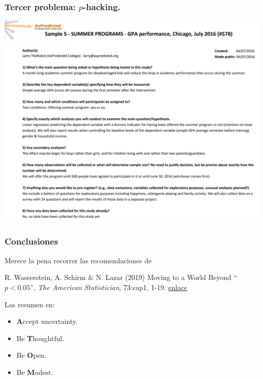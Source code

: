 \documentclass[9pt]{beamer}
\begin{document}
\begin{frame}
  \frametitle{Tercer problema: $p$-hacking.}
    \hspace*{-0.5cm}\includegraphics[height=0.9\textheight]{images/aspredicted_sample}
\end{frame}

\begin{frame}
  \frametitle{Conclusiones}
  Merece la pena recorrer las recomendaciones de
  
  \begin{block}{}
  R. Wasserstein, A. Schirm \& N. Lazar (2019)
  Moving to a World Beyond ``$p < 0.05$'', \textit{The American
    Statistician}, 73:sup1,
  1-19. \href{https://doi.org/10.1080/00031305.2019.1583913}{enlace}
    
\end{block}
Las resumen en:\medskip
\begin{center}
\end{center}

\begin{block}{}
  \begin{itemize}
  \item \textbf{\Huge A}ccept uncertainty.
  \item Be \textbf{\Huge T}houghtful.
   \item Be \textbf{\Huge O}pen.
   \item Be \textbf{\Huge M}odest. 
  \end{itemize}
\end{block}

\end{frame}
\end{document}
